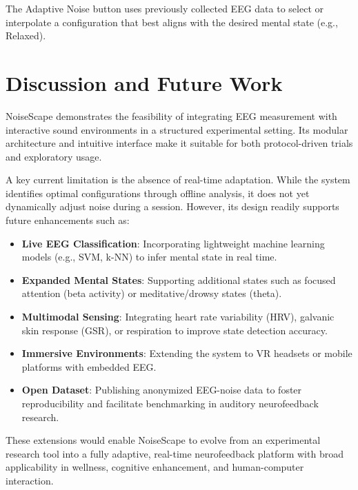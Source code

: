 The Adaptive Noise button uses previously collected EEG data to select or interpolate a configuration that best aligns with the desired mental state (e.g., Relaxed).











\section{Discussion and Future Work}

NoiseScape demonstrates the feasibility of integrating EEG measurement with interactive sound environments in a structured experimental setting. Its modular architecture and intuitive interface make it suitable for both protocol-driven trials and exploratory usage.

A key current limitation is the absence of real-time adaptation. While the system identifies optimal configurations through offline analysis, it does not yet dynamically adjust noise during a session. However, its design readily supports future enhancements such as:

\begin{itemize}
\item \textbf{Live EEG Classification}: Incorporating lightweight machine learning models (e.g., SVM, k-NN) to infer mental state in real time.
\item \textbf{Expanded Mental States}: Supporting additional states such as focused attention (beta activity) or meditative/drowsy states (theta).
\item \textbf{Multimodal Sensing}: Integrating heart rate variability (HRV), galvanic skin response (GSR), or respiration to improve state detection accuracy.
\item \textbf{Immersive Environments}: Extending the system to VR headsets or mobile platforms with embedded EEG.
\item \textbf{Open Dataset}: Publishing anonymized EEG-noise data to foster reproducibility and facilitate benchmarking in auditory neurofeedback research.
\end{itemize}

These extensions would enable NoiseScape to evolve from an experimental research tool into a fully adaptive, real-time neurofeedback platform with broad applicability in wellness, cognitive enhancement, and human-computer interaction.









